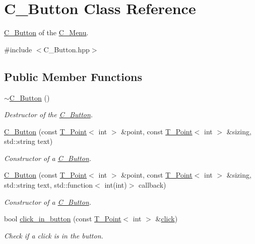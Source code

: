 \hypertarget{classButton}{}\section{C_Button Class Reference}
\label{classButton}


\hyperlink{classButton}{C_Button} of the \hyperlink{classMenu}{C_Menu}.




{\ttfamily \#include $<$C_Button.\+hpp$>$}

\subsection*{Public Member Functions}
\begin{DoxyCompactItemize}
\item 
\mbox{\label{classButton_a2a001eb9c3cc8ae54768a850dd345002}} 
\hyperlink{classButton_a2a001eb9c3cc8ae54768a850dd345002}{$\sim$\+C_Button} ()
\begin{DoxyCompactList}\small\item\em Destructor of the \hyperlink{classButton}{C_Button}. \end{DoxyCompactList}\item
\hyperlink{classButton_aaa8e2182b5ddda43df9a959815ea08bc}{C_Button} (const \hyperlink{classPoint}{T_Point}$<$ int $>$ \&point, const \hyperlink{classPoint}{T_Point}$<$ int $>$ \&sizing, std\+::string text)
\begin{DoxyCompactList}\small\item\em Constructor of a \hyperlink{classButton}{C_Button}. \end{DoxyCompactList}\item
\hyperlink{classButton_a1ddbd1d3b8b32c2ab1367f4b5c51d7d3}{C_Button} (const \hyperlink{classPoint}{T_Point}$<$ int $>$ \&point, const \hyperlink{classPoint}{T_Point}$<$ int $>$ \&sizing, std\+::string text, std\+::function$<$ int(int)$>$ callback)
\begin{DoxyCompactList}\small\item\em Constructor of a \hyperlink{classButton}{C_Button}. \end{DoxyCompactList}\item
bool \hyperlink{classButton_acf7ec691fccf7fc66863a6bb24d31ce5}{click\+\_\+in\+\_\+button} (const \hyperlink{classPoint}{T_Point}$<$ int $>$ \&\hyperlink{classButton_af6a02022f77e1809a90cb6159c1a1536}{click})
\begin{DoxyCompactList}\small\item\em Check if a click is in the button. \end{DoxyCompactList}\item 

\end{DoxyCompactItemize}
